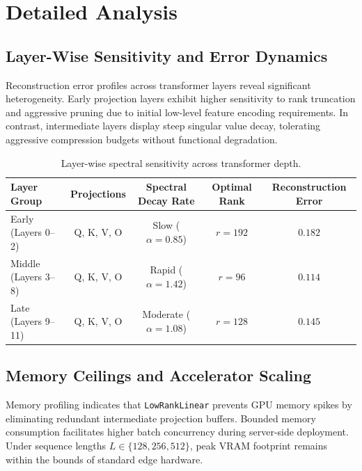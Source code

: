 \section{Detailed Analysis}

\subsection{Layer-Wise Sensitivity and Error Dynamics}
Reconstruction error profiles across transformer layers reveal significant heterogeneity. Early projection layers exhibit higher sensitivity to rank truncation and aggressive pruning due to initial low-level feature encoding requirements. In contrast, intermediate layers display steep singular value decay, tolerating aggressive compression budgets without functional degradation.

\begin{table}[H]
\centering
\small
\begin{tabular}{lcccc}
\toprule
\textbf{Layer Group} & \textbf{Projections} & \textbf{Spectral Decay Rate} & \textbf{Optimal Rank} & \textbf{Reconstruction Error} \\
\midrule
Early (Layers 0--2) & Q, K, V, O & Slow ($\alpha = 0.85$) & $r=192$ & $0.182$ \\
Middle (Layers 3--8) & Q, K, V, O & Rapid ($\alpha = 1.42$) & $r=96$ & $0.114$ \\
Late (Layers 9--11) & Q, K, V, O & Moderate ($\alpha = 1.08$) & $r=128$ & $0.145$ \\
\bottomrule
\end{tabular}
\caption{Layer-wise spectral sensitivity across transformer depth.}
\label{tab:layer_sensitivity}
\end{table}

\subsection{Memory Ceilings and Accelerator Scaling}
Memory profiling indicates that \texttt{LowRankLinear} prevents GPU memory spikes by eliminating redundant intermediate projection buffers. Bounded memory consumption facilitates higher batch concurrency during server-side deployment. Under sequence lengths $L \in \{128, 256, 512\}$, peak VRAM footprint remains within the bounds of standard edge hardware.

